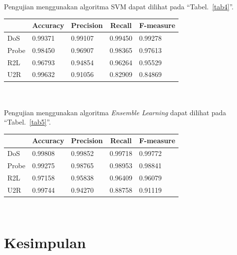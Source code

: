 \documentclass[conference]{IEEEtran}
\begin{document}
\noindent Pengujian menggunakan algoritma SVM dapat dilihat pada ``Tabel.~\ref{tab4}''.

\begin{minipage}{\linewidth}
\begin{center}
\begin{tabular}{|l|l|l|l|l|}
\hline
\multicolumn{1}{|c|}{\textbf{}}&\multicolumn{1}{|c|}{\textbf{Accuracy}}&\multicolumn{1}{|c|}{\textbf{Precision}}&\multicolumn{1}{|c|}{\textbf{Recall}}&\multicolumn{1}{|c|}{\textbf{F-measure}} \\
\hline
DoS & 0.99371 & 0.99107 & 0.99450 & 0.99278\\
\hline
Probe & 0.98450 & 0.96907 & 0.98365 & 0.97613\\
\hline
R2L & 0.96793 & 0.94854 & 0.96264 & 0.95529\\
\hline
U2R & 0.99632 & 0.91056 & 0.82909 & 0.84869\\
\hline
\end{tabular}
\label{tab4}
\end{center}
\end{minipage}\\ \\

\noindent Pengujian menggunakan algoritma \emph{Ensemble Learning} dapat dilihat pada ``Tabel.~\ref{tab5}''.\\

\begin{minipage}{\linewidth}
\begin{center}
\begin{tabular}{|l|l|l|l|l|}
\hline
\multicolumn{1}{|c|}{\textbf{}}&\multicolumn{1}{|c|}{\textbf{Accuracy}}&\multicolumn{1}{|c|}{\textbf{Precision}}&\multicolumn{1}{|c|}{\textbf{Recall}}&\multicolumn{1}{|c|}{\textbf{F-measure}} \\
\hline
DoS & 0.99808 & 0.99852 & 0.99718 & 0.99772\\
\hline
Probe & 0.99275 & 0.98765 & 0.98953 & 0.98841\\
\hline
R2L & 0.97158 & 0.95838 & 0.96409 & 0.96079\\
\hline
U2R & 0.99744 & 0.94270 & 0.88758 & 0.91119\\
\hline
\end{tabular}
\label{tab5}
\end{center}
\end{minipage}\\

\section{Kesimpulan}
\end{document}
